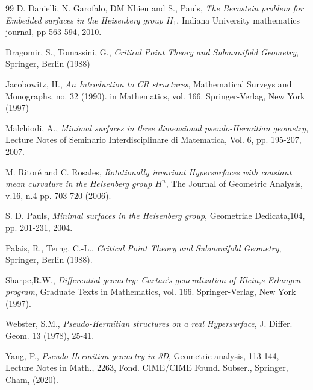 \documentclass[12pt]{amsart}
\theoremstyle{definition}\newtheorem{exa}[thm]{\sc Example}
\theoremstyle{definition}\newtheorem{de}[thm]{\sc Definition}
\theoremstyle{definition}\newtheorem{rem}[thm]{\sc Remark}
\theoremstyle{definition}\newtheorem{prob}[thm]{\it Problem}
\theoremstyle{definition}\newtheorem{fact}[thm]{\sc Fact}
\theoremstyle{definition}\newtheorem{claim}[thm]{\sc Claim}
\numberwithin{equation}{section}
\begin{document}
\begin{thebibliography}{99}
 D. Danielli, N. Garofalo, DM Nhieu and S., Pauls, {\it The Bernstein problem for Embedded surfaces in the Heisenberg group $H_{1}$},  Indiana University mathematics journal, pp 563-594, 2010.

  Dragomir, S., Tomassini, G., {\it Critical Point Theory and Submanifold Geometry}, Springer, Berlin (1988)

 Jacobowitz, H., {\it An Introduction to CR structures}, Mathematical Surveys and Monographs, no. 32 (1990).
in Mathematics, vol. 166. Springer-Verlag, New York (1997)

 Malchiodi, A., {\it Minimal surfaces in three dimensional pseudo-Hermitian geometry},  Lecture Notes of Seminario Interdisciplinare di Matematica, Vol. 6, pp. 195-207, 2007.

 M. Ritor\'{e} and C. Rosales, {\it Rotationally invariant Hypersurfaces with constant mean curvature in the Heisenberg group $H^{n}$}, The Journal of Geometric Analysis, v.16, n.4 pp. 703-720 (2006).

 S. D. Pauls, {\it Minimal surfaces in the Heisenberg group}, Geometriae Dedicata,104, pp. 201-231, 2004.

  Palais, R., Terng, C.-L., {\it Critical Point Theory and Submanifold Geometry}, Springer, Berlin (1988).

 Sharpe,R.W., {\it Differential geometry: Cartan's generalization of Klein,s Erlangen program}, Graduate Texts
in Mathematics, vol. 166. Springer-Verlag, New York (1997).

 Webster, S.M., {\it Pseudo-Hermitian structures on a real Hypersurface}, J. Differ. Geom. 13 (1978), 25-41.

Yang, P., {\it Pseudo-Hermitian geometry in 3D},  Geometric analysis, 113-144, Lecture Notes in Math., 2263, 
Fond. CIME/CIME Found. Subser., Springer, Cham, (2020).

\end{thebibliography}
\end{document}
